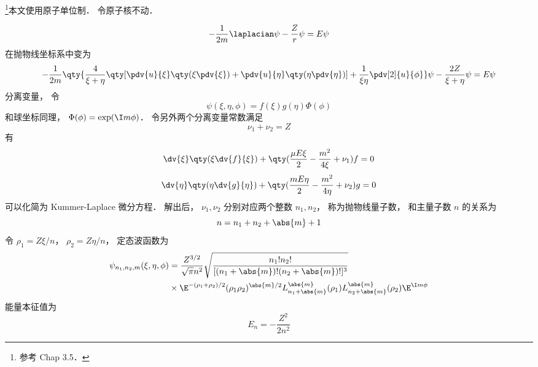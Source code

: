 
\begin{issues}
\issueDraft
{}
\end{issues}


\footnote{参考 \cite{Brandsen} Chap 3.5．}本文使用原子单位制． 令原子核不动．

\begin{equation}
-\frac{1}{2m} \laplacian \psi - \frac{Z}{r} \psi = E\psi
\end{equation}
在抛物线坐标系中变为
\begin{equation}
-\frac{1}{2m} \qty{\frac{4}{\xi + \eta} \qty[\pdv{u}{\xi}\qty(\xi\pdv{\xi}) + \pdv{u}{\eta}\qty(\eta\pdv{\eta})] + \frac{1}{\xi\eta}\pdv[2]{u}{\phi}}\psi - \frac{2Z}{\xi + \eta}\psi = E\psi
\end{equation}
分离变量， 令
\begin{equation}
\psi(\xi, \eta, \phi) = f(\xi) g(\eta) \Phi(\phi)
\end{equation}
和球坐标同理， $\Phi(\phi) = \exp(\I m \phi)$． 令另外两个分离变量常数满足
\begin{equation}
\nu_1 + \nu_2 = Z
\end{equation}
有
\begin{equation}
\dv{\xi} \qty(\xi \dv{f}{\xi}) + \qty(\frac{\mu E \xi}{2} - \frac{m^2}{4\xi} + \nu_1) f = 0
\end{equation}
\begin{equation}
\dv{\eta}\qty(\eta \dv{g}{\eta}) + \qty(\frac{mE\eta}{2} - \frac{m^2}{4\eta} + \nu_2)g = 0
\end{equation}
可以化简为 Kummer-Laplace 微分方程． 解出后， $\nu_1, \nu_2$ 分别对应两个整数 $n_1, n_2$， 称为抛物线量子数， 和主量子数 $n$ 的关系为
\begin{equation}
n = n_1 + n_2 + \abs{m} + 1
\end{equation}
令 $\rho_1 = Z\xi / n$， $\rho_2 = Z\eta/n$， 定态波函数为
\begin{equation}
\begin{aligned}
\psi_{n_1,n_2,m}(\xi,\eta,\phi) &= \frac{Z^{3/2}}{\sqrt{\pi} n^2} \sqrt{\frac{n_1!n_2!}{[(n_1+\abs{m})!(n_2+\abs{m})!]^3}} \\
&\times \E^{-(\rho_1+\rho_2)/2}(\rho_1\rho_2)^{\abs{m}/2} L_{n_1 + \abs{m}}^{\abs{m}}(\rho_1) L_{n_2 + \abs{m}}^{\abs{m}}(\rho_2) \E^{\I m\phi}
\end{aligned}
\end{equation}
能量本征值为
\begin{equation}
E_n = -\frac{Z^2}{2n^2}
\end{equation}
